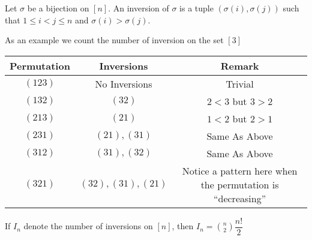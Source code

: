 \begin{definition}[Inversion]
Let $\sigma$ be a bijection on $[n]$. An inversion of $\sigma$ is a tuple $(\sigma(i),\sigma(j))$ such that $1\leq i<j\leq n$ and $\sigma(i)>\sigma(j)$.
\end{definition}
As an example we count the number of inversion on the set $[3]$
\begin{center}
\begin{tabular}{|c|c|c|}
\hline
\textbf{Permutation} & \textbf{Inversions} & \textbf{Remark} \\
\hline
$(123)$ & No Inversions & Trivial \\
\hline
$(132)$ & $(32)$ & $2<3$ but $3>2$ \\
\hline 
$(213)$ & $(21)$ & $1<2$ but $2>1$ \\
\hline
$(231)$ & $(21),(31)$ & Same As Above \\
\hline
$(312)$ & $(31),(32)$ & Same As Above \\
\hline
$(321)$ & $(32),(31),(21)$ & Notice a pattern here when the permutation is ``decreasing''\\\hline
\end{tabular}
\end{center}
\begin{claim}
    If $I_n$ denote the number of inversions on $[n]$, then $I_n = \binom{n}{2}\dfrac{n!}{2}$
\end{claim}

